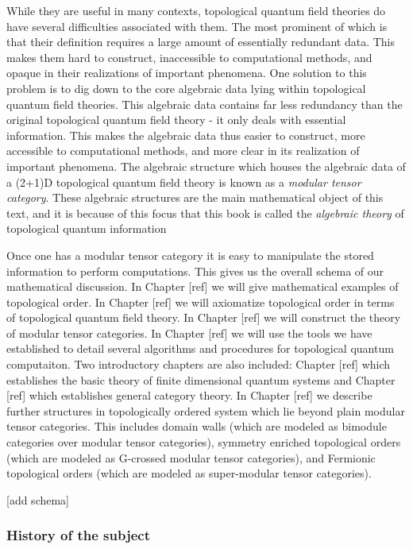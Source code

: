\documentclass{article}
\theoremstyle{definition}
\numberwithin{figure}{section}
\begin{document}
While they are useful in many contexts, topological quantum field theories do have several difficulties associated with them. The most prominent of which is that their definition requires a large amount of essentially redundant data. This makes them hard to construct, inaccessible to computational methods, and opaque in their realizations of important phenomena. One solution to this problem is to dig down to the core algebraic data lying within topological quantum field theories. This algebraic data contains far less redundancy than the original topological quantum field theory - it only deals with essential information. This makes the algebraic data thus easier to construct, more accessible to computational methods, and more clear in its realization of important phenomena. The algebraic structure which houses the algebraic data of a (2+1)D topological quantum field theory is known as a \textit{modular tensor category}. These algebraic structures are the main mathematical object of this text, and it is because of this focus that this book is called the \textit{algebraic theory} of topological quantum information

Once one has a modular tensor category it is easy to manipulate the stored information to perform computations. This gives us the overall schema of our mathematical discussion. In Chapter [ref] we will give mathematical examples of topological order. In Chapter [ref] we will axiomatize topological order in terms of topological quantum field theory. In Chapter [ref] we will construct the theory of modular tensor categories. In Chapter [ref] we will use the tools we have established to detail several algorithms and procedures for topological quantum computaiton. Two introductory chapters are also included: Chapter [ref] which establishes the basic theory of finite dimensional quantum systems and Chapter [ref] which establishes general category theory. In Chapter [ref] we describe further structures in topologically ordered system which lie beyond plain modular tensor categories. This includes domain walls (which are modeled as bimodule categories over modular tensor categories), symmetry enriched topological orders (which are modeled as G-crossed modular tensor categories), and Fermionic topological orders (which are modeled as super-modular tensor categories).

[add schema]

\subsubsection{History of the subject}
\end{document}
